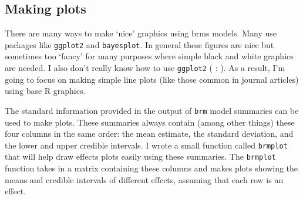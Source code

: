 \documentclass[
]{book}
\newenvironment{Shaded}{\begin{snugshade}}{\end{snugshade}}
\newcommand{\DecValTok}[1]{\textcolor[rgb]{0.00,0.00,0.81}{#1}}
\newcommand{\DocumentationTok}[1]{\textcolor[rgb]{0.56,0.35,0.01}{\textbf{\textit{#1}}}}
\newcommand{\FunctionTok}[1]{\textcolor[rgb]{0.00,0.00,0.00}{#1}}
\newcommand{\NormalTok}[1]{#1}
\newcommand{\SpecialCharTok}[1]{\textcolor[rgb]{0.00,0.00,0.00}{#1}}
\newcommand{\StringTok}[1]{\textcolor[rgb]{0.31,0.60,0.02}{#1}}
\begin{document}
\begin{Shaded}
\end{Shaded}

\hypertarget{making-plots}{%
\subsection{Making plots}\label{making-plots}}

There are many ways to make `nice' graphics using brms models. Many use packages like \texttt{ggplot2} and \texttt{bayesplot}. In general these figures are nice but sometimes too `fancy' for many purposes where simple black and white graphics are needed. I also don't really know how to use \texttt{ggplot2} ( :\textbar{} ). As a result, I'm going to focus on making simple line plots (like those common in journal articles) using base R graphics.

The standard information provided in the output of \texttt{brm} model summaries can be used to make plots. These summaries always contain (among other things) these four columns in the same order: the mean estimate, the standard deviation, and the lower and upper credible intervals. I wrote a small function called \texttt{brmplot} that will help draw effects plots easily using these summaries. The \texttt{brmplot} function takes in a matrix containing these columns and makes plots showing the means and credible intervals of different effects, assuming that each row is an effect.
\end{document}

